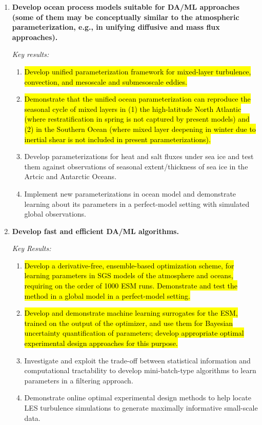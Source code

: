 \documentclass{article}
\newcommand{\hlg}[1]{{\sethlcolor{green}\hl{#1}}}
\begin{document}
\begin{enumerate}
     \item \textbf{Develop ocean process models suitable for DA/ML approaches (some of them may be conceptually similar to the atmospheric parameterization, e.g., in unifying diffusive and mass flux approaches).}
    
    \emph{Key results:}
    \begin{enumerate}
        \item \hlg{Develop unified parameterization framework for mixed-layer turbulence, convection, and mesoscale and submesoscale eddies.}
        \item \hlg{Demonstrate that the unified ocean parameterization can reproduce the seasonal cycle of mixed layers in (1) the high-latitude North Atlantic (where restratification in spring is not captured by present models) and (2) in the Southern Ocean (where mixed layer deepening in winter due to inertial shear is not included in present parameterizations).}
        \item Develop parameterizations for heat and salt fluxes under sea ice and test them against observations of seasonal extent/thickness of sea ice in the Artcic and Antarctic Oceans.
        \item Implement new parameterizations in ocean model and demonstrate learning about its parameters in a perfect-model setting with simulated global observations.
    \end{enumerate}
    
    \item \textbf{Develop fast and efficient DA/ML algorithms.}
    
    \emph{Key Results:}
     \begin{enumerate}
        \item \hlg{Develop a derivative-free, ensemble-based optimization scheme, for learning parameters in SGS models of the atmosphere and oceans, requiring on the order of 1000 ESM runs. Demonstrate and test the method in a global model in a perfect-model setting.}
        \item \hlg{Develop and demonstrate machine learning surrogates for the ESM, trained on the output of the optimizer, and use them for Bayesian uncertainty quantification of parameters; develop appropriate optimal experimental design approaches for this purpose.}
        \item Investigate and exploit the trade-off between statistical information and computational tractability to develop mini-batch-type algorithms to learn parameters in a filtering approach.
        \item Demonstrate online optimal experimental design methods to help locate LES turbulence simulations to generate maximally informative small-scale data.
    \end{enumerate}


\end{enumerate}
\end{document}
